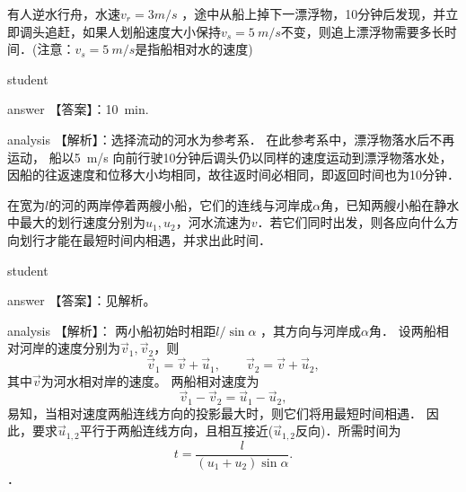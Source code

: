 \begin{example}
	有人逆水行舟，水速$ v_r=3\si{m/s}$ ，途中从船上掉下一漂浮物，10分钟后发现，并立即调头追赶，如果人划船速度大小保持$ v_s =5~\si{m/s}  $不变，则追上漂浮物需要多长时间．(注意：$ v_s =5~\si{m/s}  $是指船相对水的速度)
	
	\begin{taggedblock}{student}
		\vspace*{3cm}
	\end{taggedblock}
	
	
	\begin{taggedblock}{answer}
		【答案】：10~\si{min}.
	\end{taggedblock}
	
	\begin{taggedblock}{analysis}
		【解析】：选择流动的河水为参考系．
		在此参考系中，漂浮物落水后不再运动，
		船以\SI{5}{m/s} 向前行驶10分钟后调头仍以同样的速度运动到漂浮物落水处，
		因船的往返速度和位移大小均相同，故往返时间必相同，即返回时间也为10分钟．
	
		
	\end{taggedblock}
\end{example}



\begin{example}
	 在宽为$ l $的河的两岸停着两艘小船，它们的连线与河岸成$ \alpha $角，已知两艘小船在静水中最大的划行速度分别为$ u_1,u_2 $，河水流速为$ v $．若它们同时出发，则各应向什么方向划行才能在最短时间内相遇，并求出此时间．
	
	\begin{taggedblock}{student}
		\vspace*{3cm}
	\end{taggedblock}
	
	
	\begin{taggedblock}{answer}
		【答案】：见解析。
	\end{taggedblock}
	
	\begin{taggedblock}{analysis}
		【解析】： 两小船初始时相距$ l/\sin\alpha $ ，其方向与河岸成$ \alpha $角．
		设两船相对河岸的速度分别为$ \vec{v}_1,\vec{v}_2 $，则
		\[
		\vec{v}_1 = \vec{v}+\vec{u}_1,\qquad \vec{v}_2 = \vec{v}+\vec{u}_2,
		\]
		其中$ \vec{v} $为河水相对岸的速度。
		两船相对速度为
		\[
		\vec{v}_1 -\vec{v}_2 = 	\vec{u}_1 -\vec{u}_2,
		\]
		易知，当相对速度两船连线方向的投影最大时，则它们将用最短时间相遇．
		因此，要求$ \vec{u}_{1,2} $平行于两船连线方向，且相互接近($ \vec{u}_{1,2} $反向)．所需时间为
		\[
		t = \frac{l }{(u_1+u_2)\sin\alpha}.
		\]
	．
	\end{taggedblock}
\end{example}



